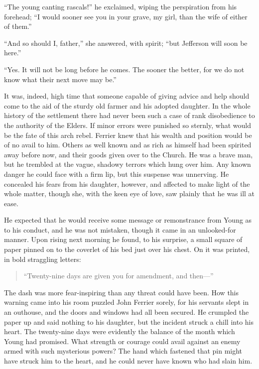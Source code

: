 \documentclass[12pt,english]{book}
\begin{document}
{}``The young canting rascals!'' he exclaimed, wiping the perspiration
from his forehead; {}``I would sooner see you in your grave, my girl,
than the wife of either of them.''

{}``And so should I, father,'' she answered, with spirit; {}``but
Jefferson will soon be here.''

{}``Yes. It will not be long before he comes. The sooner the better,
for we do not know what their next move may be.''

It was, indeed, high time that someone capable of giving advice and
help should come to the aid of the sturdy old farmer and his adopted
daughter. In the whole history of the settlement there had never been
such a case of rank disobedience to the authority of the Elders. If
minor errors were punished so sternly, what would be the fate of this
arch rebel. Ferrier knew that his wealth and position would be of
no avail to him. Others as well known and as rich as himself had been
spirited away before now, and their goods given over to the Church.
He was a brave man, but he trembled at the vague, shadowy terrors
which hung over him. Any known danger he could face with a firm lip,
but this suspense was unnerving. He concealed his fears from his daughter,
however, and affected to make light of the whole matter, though she,
with the keen eye of love, saw plainly that he was ill at ease.

He expected that he would receive some message or remonstrance from
Young as to his conduct, and he was not mistaken, though it came in
an unlooked-for manner. Upon rising next morning he found, to his
surprise, a small square of paper pinned on to the coverlet of his
bed just over his chest. On it was printed, in bold straggling letters:\mdsh{---}

\begin{center} \begin{quote} \sc

``Twenty-nine days are given you for amendment, and then---''

\end{quote} \end{center}

The dash was more fear-inspiring than any threat could have been.
How this warning came into his room puzzled John Ferrier sorely, for
his servants slept in an outhouse, and the doors and windows had all
been secured. He crumpled the paper up and said nothing to his daughter,
but the incident struck a chill into his heart. The twenty-nine days
were evidently the balance of the month which Young had promised.
What strength or courage could avail against an enemy armed with such
mysterious powers? The hand which fastened that pin might have struck
him to the heart, and he could never have known who had slain him.
\end{document}
